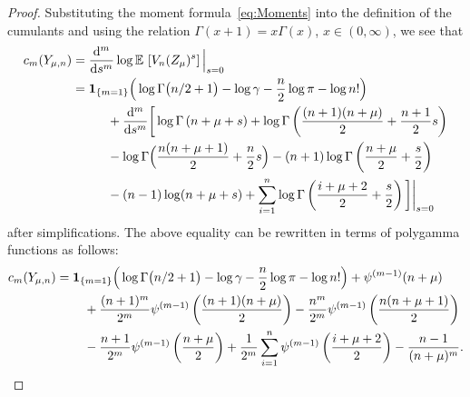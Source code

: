 \documentclass[10pt]{amsart}
\theoremstyle{definition}\newtheorem{defi}[theo]{Definition}\newtheorem{rema}[theo]{Remark}\newtheorem{exam}[theo]{Example}\newtheorem{exem}[theo]{Example}\newtheorem{nota}[theo]{Notation}
\newcommand{\EE}{\mathbb{E}\,}
\newcommand{\dd}{{\rm d}}
\begin{document}
\begin{proof}
Substituting the moment formula~\eqref{eq:Moments} into the definition of the cumulants and using the relation $\Gamma(x+1)=x\Gamma(x)$, $x\in(0,\infty)$, we see that
\begin{align*}
c_m(Y_{\mu,n})&=\frac{\dd^m}{\dd s^m}\log \EE\left[V_n(Z_{\mu})^{s}\right]\Big|_{s=0}\\
&={\bf 1}_{\{m=1\}}\Big(\log \Gamma\big(n/2+1\big)-\log\gamma-\frac{n}{2}\log\pi-\log n!\Big)\\
&\mkern50mu +\frac{\dd^m}{\dd s^m}\bigg[\log\Gamma\left(n+\mu+s\right)+\log\Gamma\left(\frac{(n+1)(n+\mu)}{2}+\frac{n+1}{2}s\right)\\
&\mkern50mu -\log\Gamma\Big(\frac{n(n+\mu+1)}{2}+\frac{n}{2}s\Big)-(n+1)\log\Gamma\left(\frac{n+\mu}{2}+\frac{s}{2}\right)\\
&\mkern50mu -(n-1)\log(n+\mu+s)+\sum\limits_{i=1}^n\log\Gamma\left(\frac{i+\mu+2}{2}+\frac{s}{2}\right)\bigg]\bigg|_{s=0}
\end{align*}
after simplifications. The above equality can be rewritten in terms of polygamma functions as follows:
\begin{align*}
c_m(Y_{\mu,n})&={\bf 1}_{\{m=1\}}\Big(\log\Gamma\big(n/2+1\big)-\log\gamma-\frac{n}{2}\log\pi-\log n!\Big)+\psi^{(m-1)}(n+\mu)\\
&\mkern40mu +\frac{(n+1)^m}{2^m}\psi^{(m-1)}\left(\frac{(n+1)(n+\mu)}{2}\right)-\frac{n^m}{2^m}\psi^{(m-1)}\left(\frac{n(n+\mu+1)}{2}\right)\\
&\mkern40mu -\frac{n+1}{2^m}\psi^{(m-1)}\left(\frac{n+\mu}{2}\right)+\frac{1}{2^m}\sum\limits_{i=1}^n\psi^{(m-1)}\left(\frac{i+\mu+2}{2}\right)-\frac{n-1}{(n+\mu)^m}.
\end{align*}


\end{proof}
\end{document}
